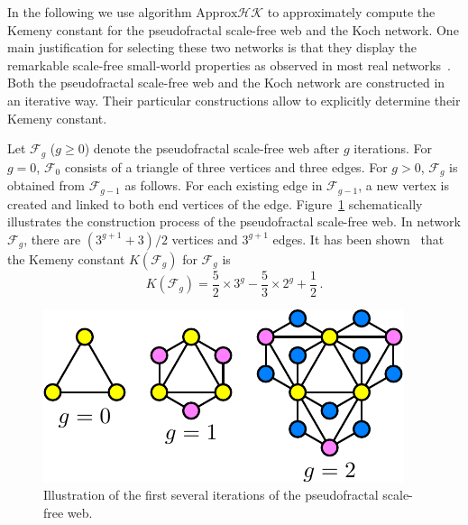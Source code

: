 \documentclass[journal]{IEEEtran}
\begin{document}
In the following we use algorithm \(\text{Approx}\mathcal{HK}\) to approximately compute the Kemeny constant for the pseudofractal scale-free web and the Koch network. One main justification for selecting these two networks is that they display the remarkable scale-free small-world properties as observed in most real networks~\cite{Ne03}.  Both the pseudofractal scale-free web and the Koch network are constructed in an iterative way. Their particular constructions allow to explicitly determine their Kemeny constant.

Let \(\mathcal{F}_g\) (\(g \geq 0\)) denote the pseudofractal scale-free web after \(g\) iterations. For \(g=0\), \( \mathcal{F}_0\) consists of a triangle of three vertices and three edges. For \(g>0\), \(\mathcal{F}_g\) is obtained from \(\mathcal{F}_{g-1}\) as follows. For each existing edge in \(\mathcal{F}_{g-1}\), a new vertex is created and linked to both end vertices of the edge.  Figure~\ref{psfw1} schematically illustrates the construction process of the pseudofractal scale-free web. In network \(\mathcal{F}_g\), there are \((3^{g+1}+3)/2\) vertices and \(3^{g+1}\) edges.  It has been shown~\cite{XiZhCo16} that the Kemeny constant \(K(\mathcal{F}_g) \) for \(\mathcal{F}_g\) is
\begin{equation}\label{Kg01}
    K(\mathcal{F}_g)=\frac{5}{2}\times3^g-\frac{5}{3}\times2^g+\frac{1}{2}\,. %
\end{equation}

\begin{figure}[!t]
    \centering
    \includegraphics[width=0.75\linewidth]{Pseudofractal-eps-converted-to.pdf}
    \caption{ Illustration of the first several iterations of the pseudofractal scale-free web. }
    \label{psfw1}
\end{figure}
\end{document}
